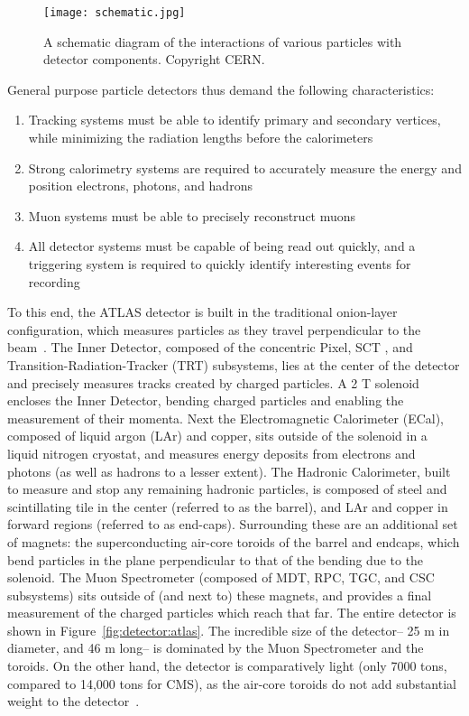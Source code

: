 
\begin{figure}
\centering
\texttt{[image: schematic.jpg]}
\label{fig:detector:schematic}
\caption{A schematic diagram of the interactions of various particles with detector components. Copyright CERN.}
\end{figure}


General purpose particle detectors thus demand the following characteristics: 

\begin{enumerate}
	\item Tracking systems must be able to identify primary and secondary vertices, while minimizing the radiation lengths before the calorimeters
	\item Strong calorimetry systems are required to accurately measure the energy and position electrons, photons, and hadrons
	\item Muon systems must be able to precisely reconstruct muons
	\item All detector systems must be capable of being read out quickly, and a triggering system is required to quickly identify interesting events for recording
\end{enumerate}

To this end, the ATLAS detector is built in the traditional onion-layer configuration, which measures particles as they travel perpendicular to the beam~\cite{ATLASPaper}. The Inner Detector, composed of the concentric Pixel, SCT , and Transition-Radiation-Tracker (TRT) subsystems, lies at the center of the detector and precisely measures tracks created by charged particles. A 2 T solenoid encloses the Inner Detector, bending charged particles and enabling the measurement of their momenta. Next the Electromagnetic Calorimeter (ECal), composed of liquid argon (LAr) and copper, sits outside of the solenoid in a liquid nitrogen cryostat, and measures energy deposits from electrons and photons (as well as hadrons to a lesser extent). The Hadronic Calorimeter, built to measure and stop any remaining hadronic particles, is composed of steel and scintillating tile in the center (referred to as the barrel), and LAr and copper in forward regions (referred to as end-caps). Surrounding these are an additional set of magnets: the superconducting air-core toroids of the barrel and endcaps, which bend particles in the plane perpendicular to that of the bending due to the solenoid.  The Muon Spectrometer (composed of MDT, RPC, TGC, and CSC subsystems) sits outside of (and next to) these magnets, and provides a final measurement of the charged particles which reach that far. The entire detector is shown in Figure~\ref{fig:detector:atlas}. The incredible size of the detector-- 25 m in diameter, and 46 m long-- is dominated by the Muon Spectrometer and the toroids. On the other hand, the detector is comparatively light (only 7000 tons, compared to 14,000 tons for CMS), as the air-core toroids do not add substantial weight to the detector~\cite{CMSPaper,ATLASPaper}.


